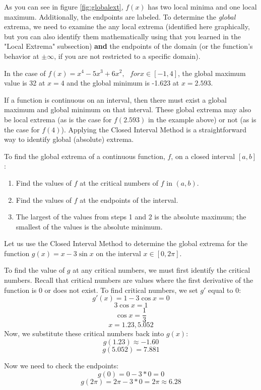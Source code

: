 As you can see in figure \ref{fig:globalext}, $f(x)$ has two local minima and 
one local maximum. Additionally, the endpoints are labeled. To determine the 
\textit{global} extrema, we need to examine the any local extrema (identified 
here graphically, but you can also identify them mathematically using that you 
learned in the "Local Extrema" subsection) \textbf{and} the endpoints of the domain (or 
the function's behavior at $\pm \infty$, if you are not restricted to a specific 
domain). 

In the case of $f(x) = x^4-5x^3+6x^2,\text{ }for x\in [-1,4]$, the global 
maximum value is 32 at $x=4$ and the global minimum is -1.623 at $x=2.593$. 

If a function is continuous on an interval, then there must exist a global 
maximum and global minimum on that interval. These global extrema may also be 
local extrema (as is the case for $f(2.593)$ in the example above) or not (as 
is the case for $f(4)$). Applying the Closed Interval Method is a 
straightforward way to identify global (absolute) extrema. 

To find the global 
extrema of a continuous function, $f$, on a closed interval $[a, b]$:
\begin{enumerate}
	\item Find the values of $f$ at the critical numbers of $f$ in $(a, b)$.
	\item Find the values of $f$ at the endpoints of the interval.
	\item The largest of the values from steps 1 and 2 is the absolute maximum; 
	the smallest of the values is the absolute minimum.
\end{enumerate}

Let us use the Closed Interval Method to determine the global extrema for the 
function $g(x) = x-3\sin{x}$ on the interval $x \in [0, 2\pi]$.

To find the value of $g$ at any critical numbers, we must first identify the 
critical numbers. Recall that critical numbers are values where the first 
derivative of the function is $0$ or does not exist. To find critical numbers, 
we set $g'$ equal to $0$:
$$g'(x) = 1-3\cos{x}=0$$
$$3\cos{x} = 1$$
$$\cos{x} = \frac{1}{3}$$
$$x=1.23, 5.052$$
Now, we substitute these critical numbers back into $g(x)$:
$$g(1.23) \approx -1.60$$
$$g(5.052) = 7.881$$

Now we need to check the endpoints:
$$g(0) = 0-3*0 = 0$$
$$g(2\pi) = 2\pi - 3*0 = 2\pi \approx 6.28$$

